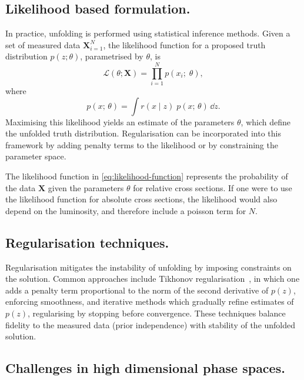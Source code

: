\subsection{Likelihood based formulation.}
    In practice, unfolding is performed using statistical inference methods.
    Given a set of measured data \(\mathbf{X}_{i=1}^N\), the likelihood function for a proposed truth distribution \(p(z; \theta)\), parametrised by \(\theta\), is
    \begin{equation}
        \label{eq:likelihood-function}
        \mathcal{L}(\theta; \mathbf{X}) = \prod_{i=1}^{N} p(x_i;\; \theta),
    \end{equation}
    where
    \begin{equation}
        p(x;\, \theta) = \int r(x\mid z) \;p(x;\,\theta) \, \dd z.
    \end{equation}
    Maximising this likelihood yields an estimate of the parameters \(\theta\), which define the unfolded truth distribution.
    Regularisation can be incorporated into this framework by adding penalty terms to the likelihood or by constraining the parameter space.

    \begin{note*}
        The likelihood function in \cref{eq:likelihood-function} represents the probability of the data \(\mathbf{X}\) given the parameters \(\theta\) for relative cross sections.
        If one were to use the likelihood function for absolute cross sections, the likelihood would also depend on the luminosity, and therefore include a poisson term for \(N\).
    \end{note*}
    \subsection{Regularisation techniques.}
        Regularisation mitigates the instability of unfolding by imposing constraints on the solution.
        Common approaches include Tikhonov regularisation~\cite{Karl2005RegularizationReconstruction}, in which one adds a penalty term proportional to the norm of the second derivative of \(p(z)\), enforcing smoothness, and iterative methods which gradually refine estimates of \(p(z)\), regularising by stopping before convergence.
        These techniques balance fidelity to the measured data (prior independence) with stability of the unfolded solution.

    \subsection{Challenges in high dimensional phase spaces.}
    \label{subsec:challenges-in-high-dimensional-phase-spaces}
